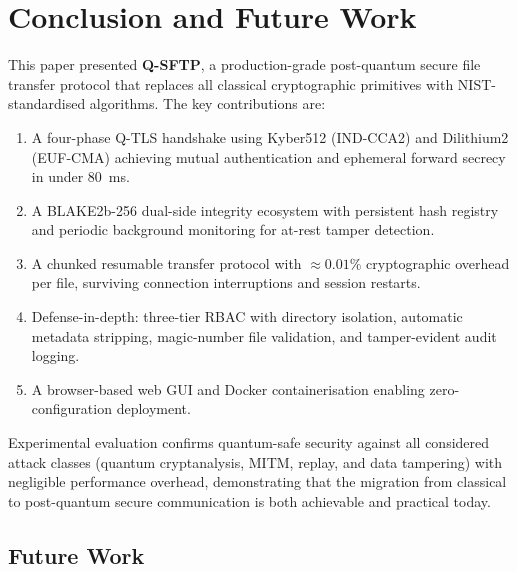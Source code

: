 \section{Conclusion and Future Work}
\label{sec:conclusion}

This paper presented \textbf{Q-SFTP}, a production-grade post-quantum
secure file transfer protocol that replaces all classical cryptographic
primitives with NIST-standardised algorithms. The key contributions are:

\begin{enumerate}
  \item A four-phase Q-TLS handshake using Kyber512 (IND-CCA2) and
        Dilithium2 (EUF-CMA) achieving mutual authentication and
        ephemeral forward secrecy in under 80~ms.
  \item A BLAKE2b-256 dual-side integrity ecosystem with persistent
        hash registry and periodic background monitoring for at-rest
        tamper detection.
  \item A chunked resumable transfer protocol with $\approx 0.01\%$
        cryptographic overhead per file, surviving connection
        interruptions and session restarts.
  \item Defense-in-depth: three-tier RBAC with directory isolation,
        automatic metadata stripping, magic-number file validation,
        and tamper-evident audit logging.
  \item A browser-based web GUI and Docker containerisation enabling
        zero-configuration deployment.
\end{enumerate}

Experimental evaluation confirms quantum-safe security against all
considered attack classes (quantum cryptanalysis, MITM, replay, and
data tampering) with negligible performance overhead, demonstrating
that the migration from classical to post-quantum secure communication
is both achievable and practical today.

\subsection*{Future Work}

